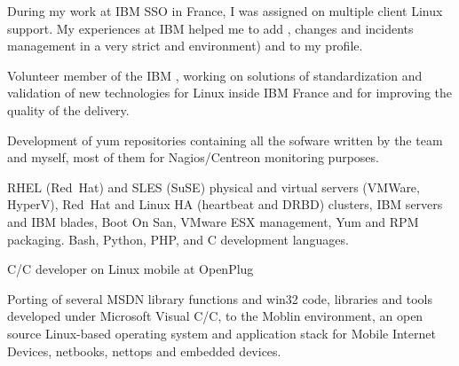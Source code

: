 

During my work at IBM SSO in France, I was assigned on multiple client Linux
support. My experiences at IBM helped me to add ,
 changes and incidents management in a very strict
 and  environment) and 
to my profile.

Volunteer member of the IBM , working on
solutions of standardization and validation of new technologies for Linux
inside IBM France and for improving the quality of the delivery.

Development of yum repositories containing all the sofware written by the team
and myself, most of them for Nagios/Centreon monitoring purposes.

\tinyskip\noindent
\technologies
RHEL (Red~Hat) and SLES (SuSE) physical and virtual
servers (VMWare, HyperV),
Red~Hat and Linux HA (heartbeat and DRBD) clusters,
IBM servers and IBM blades, Boot On San,
VMware ESX management,
Yum and RPM packaging.
Bash, Python, PHP, and C development languages.


   {C/C\plusplus{} developer on Linux mobile at OpenPlug}

Porting of several MSDN library functions and win32 code, libraries and tools
developed under Microsoft Visual C/C\plusplus, to the Moblin environment,
an open source Linux-based operating system and application stack for
Mobile Internet Devices, netbooks, nettops and embedded devices.

%


